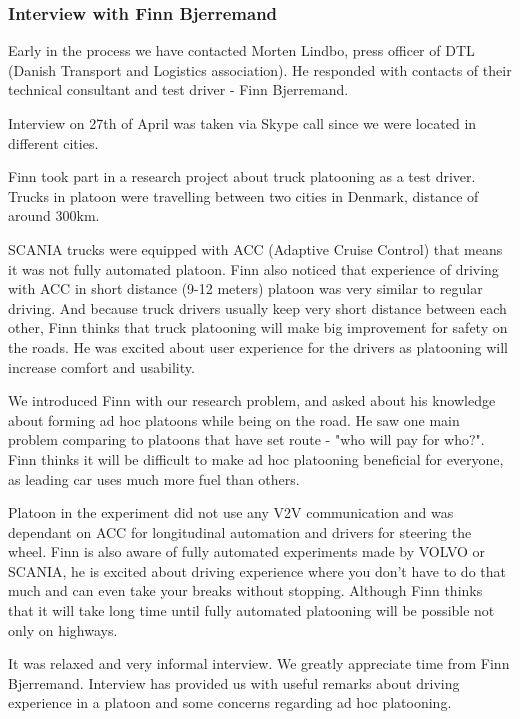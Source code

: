 \subsubsection{Interview with Finn Bjerremand}

Early in the process we have contacted Morten Lindbo, press officer of DTL (Danish Transport and Logistics association). He responded with contacts of their technical consultant and test driver - Finn Bjerremand.\par
% 
Interview on 27th of April was taken via Skype call since we were located in different cities.\par
% 
Finn took part in a research project about truck platooning as a test driver. Trucks in platoon were travelling between two cities in Denmark, distance of around 300km.\par
% 
SCANIA trucks were equipped with ACC (Adaptive Cruise Control) that means it was not fully automated platoon. Finn also noticed that experience of driving with ACC in short distance (9-12 meters) platoon was very similar to regular driving. And because truck drivers usually keep very short distance between each other, Finn thinks that truck platooning will make big improvement for safety on the roads. He was excited about user experience for the drivers as platooning will increase comfort and usability.\par
% 
We introduced Finn with our research problem, and asked about his knowledge about forming ad hoc platoons while being on the road. He saw one main problem comparing to platoons that have set route - "who will pay for who?". Finn thinks it will be difficult to make ad hoc platooning beneficial for everyone, as leading car uses much more fuel than others.\par
% 
Platoon in the experiment did not use any V2V communication and was dependant on ACC for longitudinal automation and drivers for steering the wheel. Finn is also aware of fully automated experiments made by VOLVO or SCANIA, he is excited about driving experience where you don't have to do that much and can even take your breaks without stopping. Although Finn thinks that it will take long time until fully automated platooning will be possible not only on highways.\par
% 
It was relaxed and very informal interview. We greatly appreciate time from Finn Bjerremand. Interview has provided us with useful remarks about driving experience in a platoon and some concerns regarding ad hoc platooning.